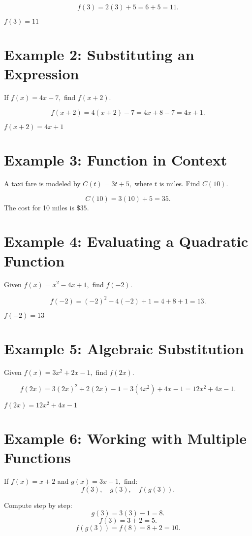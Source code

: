 \documentclass[12pt]{article}
\begin{document}
\[
f(3) = 2(3) + 5 = 6 + 5 = 11.
\]

\(\boxed{f(3) = 11}\)

\section*{Example 2: Substituting an Expression}

If \(f(x) = 4x - 7,\) find \(f(x + 2).\)

\[
f(x + 2) = 4(x + 2) - 7 = 4x + 8 - 7 = 4x + 1.
\]

\(\boxed{f(x + 2) = 4x + 1}\)

\section*{Example 3: Function in Context}

A taxi fare is modeled by \(C(t) = 3t + 5,\) where \(t\) is miles.  
Find \(C(10)\).

\[
C(10) = 3(10) + 5 = 35.
\]
The cost for 10 miles is \(\boxed{\$35}.\)

\section*{Example 4: Evaluating a Quadratic Function}

Given \(f(x) = x^2 - 4x + 1,\) find \(f(-2)\).

\[
f(-2) = (-2)^2 - 4(-2) + 1 = 4 + 8 + 1 = 13.
\]

\(\boxed{f(-2) = 13}\)

\section*{Example 5: Algebraic Substitution}

Given \(f(x) = 3x^2 + 2x - 1,\) find \(f(2x).\)

\[
f(2x) = 3(2x)^2 + 2(2x) - 1 = 3(4x^2) + 4x - 1 = 12x^2 + 4x - 1.
\]

\(\boxed{f(2x) = 12x^2 + 4x - 1}\)

\section*{Example 6: Working with Multiple Functions}

If \(f(x) = x + 2\) and \(g(x) = 3x - 1,\) find:
\[
f(3), \quad g(3), \quad f(g(3)).
\]

Compute step by step:
\[
g(3) = 3(3) - 1 = 8.
\]
\[
f(3) = 3 + 2 = 5.
\]
\[
f(g(3)) = f(8) = 8 + 2 = 10.
\]
\end{document}

